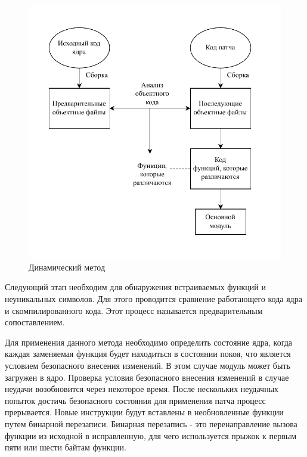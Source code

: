 \begin{figure}[H]
	\begin{center}
		\includegraphics[scale=0.8]{img/dynamic.pdf}
	\end{center}
	\captionsetup{justification=centering}
	\caption{Динамический метод}
	\label{img:dynamic}
\end{figure}

Следующий этап необходим для обнаружения встраиваемых функций и неуникальных символов. Для этого проводится сравнение работающего кода ядра и скомпилированного кода. Этот процесс называется предварительным сопоставлением.

Для применения данного метода необходимо определить состояние ядра, когда каждая заменяемая функция будет находиться в состоянии покоя, что является условием безопасного внесения изменений. В этом случае модуль может быть загружен в ядро. Проверка условия безопасного внесения изменений в случае неудачи возобновится через некоторое время. После нескольких неудачных попыток достичь безопасного состояния для применения патча процесс прерывается. Новые инструкции будут вставлены в необновленные функции путем бинарной перезаписи. Бинарная перезапись - это перенаправление вызова функции из исходной в исправленную, для чего используется прыжок к первым пяти или шести байтам функции.

